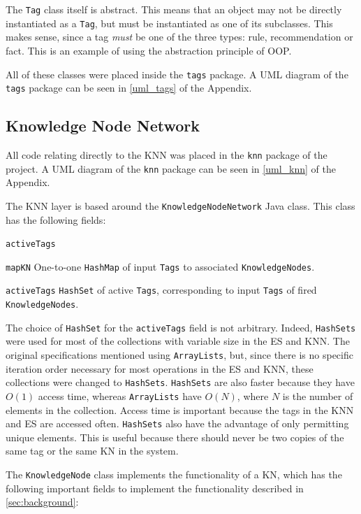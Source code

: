 \documentclass[titlepage,11pt]{article}
\newcommand{\code}[1]{\texttt{#1}}
\begin{document}
The \code{Tag} class itself is abstract. This means that an object may not be directly instantiated as a \code{Tag}, but must be instantiated as one of its subclasses. This makes sense, since a tag \emph{must} be one of the three types: rule, recommendation or fact. This is an example of using the abstraction principle of OOP.

All of these classes were placed inside the \code{tags} package. A UML diagram of the \code{tags} package can be seen in \autoref{uml_tags} of the Appendix.

\subsection{Knowledge Node Network}

All code relating directly to the KNN was placed in the \code{knn} package of the project. A UML diagram of the \code{knn} package can be seen in \autoref{uml_knn} of the Appendix.

The KNN layer is based around the \code{KnowledgeNodeNetwork} Java class. This class has the following fields:

\begin{labeling}{\code{activeTags}}
	\item[\code{mapKN}] One-to-one \code{HashMap} of input \code{Tags} to associated \code{KnowledgeNodes}.
	\item[\code{activeTags}] \code{HashSet} of active \code{Tags}, corresponding to input \code{Tags} of fired \code{KnowledgeNodes}.
\end{labeling}

The choice of \code{HashSet} for the \code{activeTags} field is not arbitrary. Indeed, \code{HashSets} were used for most of the collections with variable size in the ES and KNN. The original specifications mentioned using \code{ArrayLists}, but, since there is no specific iteration order necessary for most operations in the ES and KNN, these collections were changed to \code{HashSets}. \code{HashSets} are also faster because they have $O(1)$ access time, whereas \code{ArrayLists} have $O(N)$, where $N$ is the number of elements in the collection. Access time is important because the tags in the KNN and ES are accessed often. \code{HashSets} also have the advantage of only permitting unique elements. This is useful because there should never be two copies of the same tag or the same KN in the system.

The \code{KnowledgeNode} class implements the functionality of a KN, which has the following important fields to implement the functionality described in \autoref{sec:background}:
\end{document}
